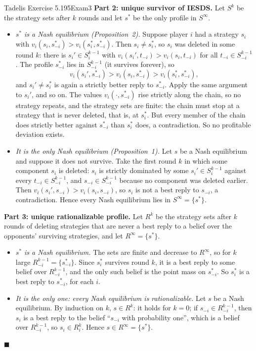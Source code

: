 \begin{exsol}{Tadelis Exercise 5.1}{95}{Exam}{3}
\textbf{Part 2: unique survivor of IESDS.} Let $S^k$ be the strategy sets after $k$ rounds and let
$s^*$ be the only profile in $S^\infty$.
\begin{itemize}
  \item \emph{$s^*$ is a Nash equilibrium (Proposition~2).} Suppose player $i$ had a strategy $s_i$
  with $v_i(s_i, s^*_{-i}) > v_i(s^*_i, s^*_{-i})$. Then $s_i \ne s_i^*$, so $s_i$ was deleted in
  some round $k$: there is $s_i' \in S_i^{k-1}$ with $v_i(s_i', t_{-i}) > v_i(s_i, t_{-i})$ for all
  $t_{-i} \in S_{-i}^{k-1}$. The profile $s^*_{-i}$ lies in $S_{-i}^{k-1}$ (it survives forever), so
  \[
    v_i(s_i', s^*_{-i}) > v_i(s_i, s^*_{-i}) > v_i(s_i^*, s^*_{-i}),
  \]
  and $s_i' \ne s_i^*$ is again a strictly better reply to $s^*_{-i}$. Apply the same argument to
  $s_i'$, and so on. The values $v_i(\cdot, s^*_{-i})$ rise strictly along the chain, so no strategy
  repeats, and the strategy sets are finite: the chain must stop at a strategy that is never
  deleted, that is, at $s_i^*$. But every member of the chain does strictly better against
  $s^*_{-i}$ than $s_i^*$ does, a contradiction. So no profitable deviation exists.
  \item \emph{It is the only Nash equilibrium (Proposition~1).} Let $s$ be a Nash equilibrium and
  suppose it does not survive. Take the first round $k$ in which some component $s_i$ is deleted:
  $s_i$ is strictly dominated by some $s_i' \in S_i^{k-1}$ against every $t_{-i} \in S_{-i}^{k-1}$,
  and $s_{-i} \in S_{-i}^{k-1}$ because no component was deleted earlier. Then
  $v_i(s_i', s_{-i}) > v_i(s_i, s_{-i})$, so $s_i$ is not a best reply to $s_{-i}$, a contradiction.
  Hence every Nash equilibrium lies in $S^\infty = \{s^*\}$.
\end{itemize}

\textbf{Part 3: unique rationalizable profile.} Let $R^k$ be the strategy sets after $k$ rounds of
deleting strategies that are never a best reply to a belief over the opponents' surviving
strategies, and let $R^\infty = \{s^*\}$.
\begin{itemize}
  \item \emph{$s^*$ is a Nash equilibrium.} The sets are finite and decrease to $R^\infty$, so for
  $k$ large $R^{k-1}_{-i} = \{s^*_{-i}\}$. Since $s_i^*$ survives round $k$, it is a best reply to some
  belief over $R^{k-1}_{-i}$, and the only such belief is the point mass on $s^*_{-i}$. So $s_i^*$ is a
  best reply to $s^*_{-i}$, for each $i$.
  \item \emph{It is the only one: every Nash equilibrium is rationalizable.} Let $s$ be a Nash
  equilibrium. By induction on $k$, $s \in R^k$: it holds for $k = 0$; if $s_{-i} \in R^{k-1}_{-i}$,
  then $s_i$ is a best reply to the belief ``$s_{-i}$ with probability one'', which is a belief over
  $R^{k-1}_{-i}$, so $s_i \in R^k_i$. Hence $s \in R^\infty = \{s^*\}$.
\end{itemize}
$\blacksquare$


\end{exsol}
